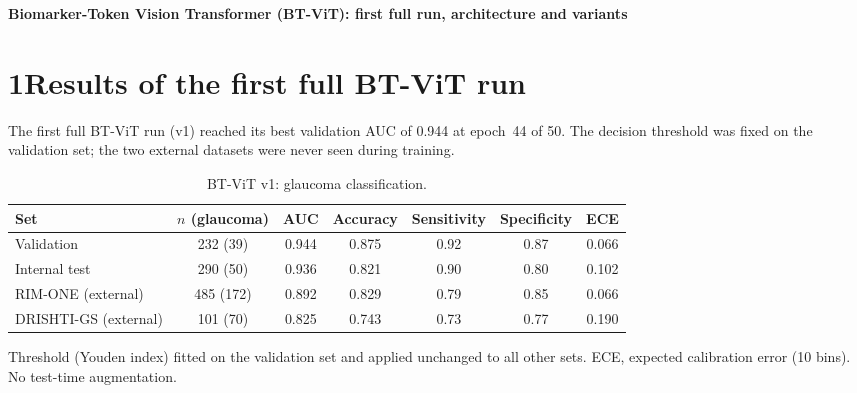 \documentclass[10pt]{article}
\begin{document}
\begin{center}
{\large\bfseries Biomarker-Token Vision Transformer (BT-ViT): first full run, architecture and variants}
\end{center}

\section*{1\quad Results of the first full BT-ViT run}

The first full BT-ViT run (v1) reached its best validation AUC of 0.944 at epoch~44 of 50. The decision
threshold was fixed on the validation set; the two external datasets were never seen during training.

\begin{table}[h]
\centering
\begin{threeparttable}
\caption{BT-ViT v1: glaucoma classification.}
\label{tab:r-cls}
\small
\begin{tabular}{@{}lcccccc@{}}
\toprule
Set & $n$ (glaucoma) & AUC & Accuracy & Sensitivity & Specificity & ECE \\
\midrule
Validation              & 232 (39)  & 0.944 & 0.875 & 0.92 & 0.87 & 0.066 \\
Internal test           & 290 (50)  & 0.936 & 0.821 & 0.90 & 0.80 & 0.102 \\
RIM-ONE (external)      & 485 (172) & 0.892 & 0.829 & 0.79 & 0.85 & 0.066 \\
DRISHTI-GS (external)   & 101 (70)  & 0.825 & 0.743 & 0.73 & 0.77 & 0.190 \\
\bottomrule
\end{tabular}
\begin{tablenotes}\footnotesize
\item[] Threshold (Youden index) fitted on the validation set and applied unchanged to all other sets.
ECE, expected calibration error (10 bins). No test-time augmentation.
\end{tablenotes}
\end{threeparttable}
\end{table}
\end{document}
